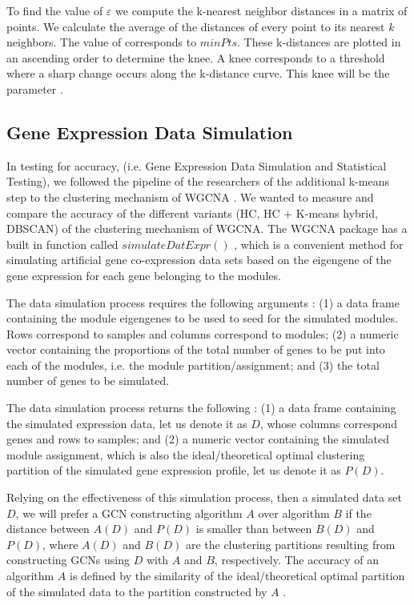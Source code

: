 \documentclass[sigconf,authordraft]{acmart}
\begin{document}
To find the value of $\varepsilon$ we compute the k-nearest neighbor distances in a matrix of points. We calculate the average of the distances of every point to its nearest $k$ neighbors. The value of corresponds to $minPts$. These k-distances are plotted in an ascending order to determine the knee. A knee corresponds to a threshold where a sharp change occurs along the k-distance curve. This knee will be the parameter \cite{EsterEtal1996}.

\subsection{Gene Expression Data Simulation}
In testing for accuracy, (i.e. Gene Expression Data Simulation and Statistical Testing), we followed the pipeline of the researchers of the additional k-means step to the clustering mechanism of WGCNA \cite{BotiaEtal2017}. We wanted to measure and compare the accuracy of the different variants (HC, HC + K-means hybrid, DBSCAN) of the clustering mechanism of WGCNA. The WGCNA package has a built in function called $simulateDatExpr()$ \cite{LangfelderHorvath2008}, which is a convenient method for simulating artificial  gene co-expression data sets based on the eigengene of the gene expression for each gene belonging to the modules.

The data simulation process requires the following arguments \cite{LangfelderHorvath2008}: (1) a data frame containing the module eigengenes to be used to seed for the simulated modules. Rows correspond to samples and columns correspond to modules; (2) a numeric vector containing the proportions of the total number of genes to be put into each of the modules, i.e. the module partition/assignment; and (3) the total number of genes to be simulated. 

The data simulation process returns the following \cite{LangfelderHorvath2008}: (1) a data frame containing the simulated expression data, let us denote it as $D$, whose columns correspond genes and rows to samples; and (2) a numeric vector containing the simulated module assignment, which is also the ideal/theoretical optimal clustering partition of the simulated gene expression profile, let us denote it as $P(D)$.

Relying on the effectiveness of this simulation process, then a simulated data set $D$, we will prefer a GCN constructing algorithm $A$ over algorithm $B$ if the distance between $A(D)$ and $P(D)$ is smaller than between $B(D)$ and $P(D)$, where $A(D)$ and $B(D)$ are the clustering partitions resulting from constructing GCNs using $D$ with $A$ and $B$, respectively. The accuracy of an algorithm $A$ is defined by the similarity of the ideal/theoretical optimal partition of the simulated data to the partition constructed by $A$ \cite{BotiaEtal2017}.
\end{document}
